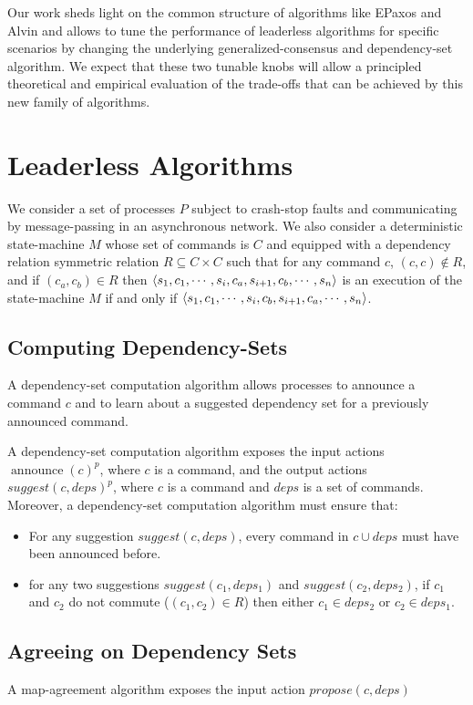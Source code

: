 Our work sheds light on the common structure of algorithms like EPaxos and Alvin and allows to tune the performance of leaderless algorithms for specific scenarios by changing the underlying generalized-consensus and dependency-set algorithm. 
We expect that these two tunable knobs will allow a principled theoretical and empirical evaluation of the trade-offs that can be achieved by this new family of algorithms.

\section{Leaderless Algorithms}

We consider a set of processes $P$ subject to crash-stop faults and communicating by message-passing in an asynchronous network.
We also consider a deterministic state-machine $M$ whose set of commands is $C$ and equipped with a dependency relation symmetric relation $R \subseteq C\times C$ such that for any command $c$, $\left( c,c \right)\notin R$, and if $\left( c_a,c_b \right)\in R$ then $\left\langle s_1,c_1,\cdots,s_i,c_a,s_{i+1},c_b,\cdots,s_n\right\rangle$ is an execution of the state-machine $M$ if and only if
$\left\langle s_1,c_1,\cdots,s_i,c_b,s_{i+1},c_a,\cdots,s_n\right\rangle$.

\subsection{Computing Dependency-Sets}

A dependency-set computation algorithm allows processes to announce a command $c$ and to learn about a suggested dependency set for a previously announced command.

A dependency-set computation algorithm exposes the input actions ${\operatorname{announce}\left( c \right)}^p$, where $c$ is a command, and the output actions ${suggest\left( c, deps \right)}^p$, where $c$ is a command and $deps$ is a set of commands.
Moreover, a dependency-set computation algorithm must ensure that:
\begin{itemize}[noitemsep,nolistsep]
    \item For any suggestion ${suggest\left( c, deps \right)}$, every command in $c\cup deps$ must have been announced before.
    \item for any two suggestions $suggest\left( c_1, deps_1 \right)$ and $suggest\left( c_2, deps_2 \right)$,  if $c_1$ and $c_2$ do not commute ($\left( c_1,c_2 \right) \in R$) then either $c_1\in deps_2$ or $c_2 \in deps_1$.
\end{itemize}

\subsection{Agreeing on Dependency Sets}

A map-agreement algorithm exposes the input action $propose\left( c, deps \right)$

\printbibliography%


